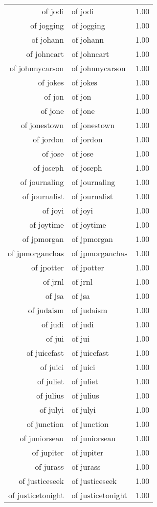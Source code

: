 \begin{table}[ht]
\begin{tabular}{rlr}
  of jodi & of jodi & 1.00 \\ 
  of jogging & of jogging & 1.00 \\ 
  of johann & of johann & 1.00 \\ 
  of johncart & of johncart & 1.00 \\ 
  of johnnycarson & of johnnycarson & 1.00 \\ 
  of jokes & of jokes & 1.00 \\ 
  of jon & of jon & 1.00 \\ 
  of jone & of jone & 1.00 \\ 
  of jonestown & of jonestown & 1.00 \\ 
  of jordon & of jordon & 1.00 \\ 
  of jose & of jose & 1.00 \\ 
  of joseph & of joseph & 1.00 \\ 
  of journaling & of journaling & 1.00 \\ 
  of journalist & of journalist & 1.00 \\ 
  of joyi & of joyi & 1.00 \\ 
  of joytime & of joytime & 1.00 \\ 
  of jpmorgan & of jpmorgan & 1.00 \\ 
  of jpmorganchas & of jpmorganchas & 1.00 \\ 
  of jpotter & of jpotter & 1.00 \\ 
  of jrnl & of jrnl & 1.00 \\ 
  of jsa & of jsa & 1.00 \\ 
  of judaism & of judaism & 1.00 \\ 
  of judi & of judi & 1.00 \\ 
  of jui & of jui & 1.00 \\ 
  of juicefast & of juicefast & 1.00 \\ 
  of juici & of juici & 1.00 \\ 
  of juliet & of juliet & 1.00 \\ 
  of julius & of julius & 1.00 \\ 
  of julyi & of julyi & 1.00 \\ 
  of junction & of junction & 1.00 \\ 
  of juniorseau & of juniorseau & 1.00 \\ 
  of jupiter & of jupiter & 1.00 \\ 
  of jurass & of jurass & 1.00 \\ 
  of justiceseek & of justiceseek & 1.00 \\ 
  of justicetonight & of justicetonight & 1.00 \\ 

\end{tabular}
\end{table}
